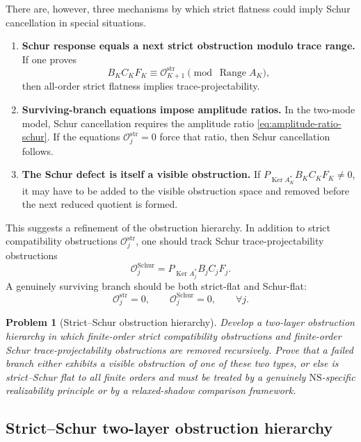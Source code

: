 \documentclass[11pt]{article}
\numberwithin{equation}{section}
\newtheorem{problem}[theorem]{Problem}
\DeclareMathOperator{\Range}{Range}
\DeclareMathOperator{\Ker}{Ker}
\newcommand{\str}{\mathrm{str}}
\newcommand{\NS}{\mathrm{NS}}
\newcommand{\calO}{\mathcal O}
\begin{document}
There are, however, three mechanisms by which strict flatness could imply Schur cancellation in special situations.

\begin{enumerate}[label=(\alph*)]
\item \textbf{Schur response equals a next strict obstruction modulo trace range.}  If one proves
\[
        B_KC_KF_K
        \equiv \calO_{K+1}^{\str}
        \pmod{\Range A_K},
\]
then all-order strict flatness implies trace-projectability.

\item \textbf{Surviving-branch equations impose amplitude ratios.}  In the two-mode model, Schur cancellation requires the amplitude ratio \eqref{eq:amplitude-ratio-schur}.  If the equations \(\calO_j^{\str}=0\) force that ratio, then Schur cancellation follows.

\item \textbf{The Schur defect is itself a visible obstruction.}  If \(P_{\Ker A_K^*}B_KC_KF_K\ne0\), it may have to be added to the visible obstruction space and removed before the next reduced quotient is formed.
\end{enumerate}

This suggests a refinement of the obstruction hierarchy.  In addition to strict compatibility obstructions \(\calO_j^{\str}\), one should track Schur trace-projectability obstructions
\[
        \calO_j^{\mathrm{Schur}}
        =P_{\Ker A_j^*}B_jC_jF_j.
\]
A genuinely surviving branch should be both strict-flat and Schur-flat:
\begin{equation}\label{eq:strict--Schur-flat}
        \calO_j^{\str}=0,
        \qquad
        \calO_j^{\mathrm{Schur}}=0,
        \qquad
        \forall j.
\end{equation}

\begin{problem}[Strict--Schur obstruction hierarchy]\label{prob:strict--Schur-hierarchy}
Develop a two-layer obstruction hierarchy in which finite-order strict compatibility obstructions and finite-order Schur trace-projectability obstructions are removed recursively.  Prove that a failed branch either exhibits a visible obstruction of one of these two types, or else is strict--Schur flat to all finite orders and must be treated by a genuinely \(\NS\)-specific realizability principle or by a relaxed-shadow comparison framework.
\end{problem}

\subsection{Strict--Schur two-layer obstruction hierarchy}\label{subsec:strict--Schur-two-layer}
\end{document}
